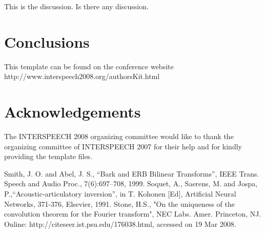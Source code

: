 \documentclass{article}
\begin{document}
This is the discussion. Is there any discussion.


\section{Conclusions}

This template can be found on the conference website 
http://www.interspeech2008.org/authorsKit.html

\section{Acknowledgements}
The INTERSPEECH 2008 organizing committee would like to thank the
organizing committee of INTERSPEECH 2007 for their help
and for kindly providing the template files.

%
\eightpt

\begin{thebibliography}{10}
 Smith, J. O. and Abel, J. S., 
``Bark and {ERB} Bilinear Transforms'', 
IEEE Trans. Speech and Audio Proc., 7(6):697--708, 1999.  
 Soquet, A., Saerens, M. and Jospa, P.,``Acoustic-articulatory
inversion'', in T. Kohonen [Ed], Artificial Neural Networks, 371-376,
Elsevier, 1991.
 Stone, H.S., "On the uniqueness of the convolution theorem
for the Fourier transform", NEC Labs. Amer. Princeton, NJ. 
Online: http://citeseer.ist.psu.edu/176038.html, accessed on 19 Mar 2008.
\end{thebibliography}
\end{document}
